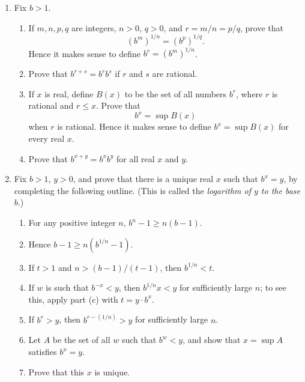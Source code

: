 \documentclass[12pt]{article}
\begin{document}
\begin{enumerate}
        \item Fix $b > 1$.
    \begin{enumerate}
        \item If $m, n, p, q$ are integers, $n > 0$, $q > 0$, and $r = m/n = p/q$, prove that
        \[
            (b^m)^{1/n} = (b^p)^{1/q}.
        \]
        Hence it makes sense to define $b^r = (b^m)^{1/n}$.

        \item Prove that $b^{r+s} = b^r b^s$ if $r$ and $s$ are rational.

        \item If $x$ is real, define $B(x)$ to be the set of all numbers $b^r$, where $r$ is rational and $r \leq x$. Prove that
        \[
            b^x = \sup B(x)
        \]
        when $r$ is rational. Hence it makes sense to define $b^x = \sup B(x)$ for every real $x$.

        \item Prove that $b^{x+y} = b^x b^y$ for all real $x$ and $y$.
    \end{enumerate}

    \item Fix $b > 1$, $y > 0$, and prove that there is a unique real $x$ such that $b^x = y$, by completing the following outline. (This is called the \emph{logarithm of $y$ to the base $b$}.)
    \begin{enumerate}
        \item For any positive integer $n$, $b^n - 1 \geq n(b - 1)$.

        \item Hence $b - 1 \geq n(b^{1/n} - 1)$.

        \item If $t > 1$ and $n > (b - 1)/(t - 1)$, then $b^{1/n} < t$.

        \item If $w$ is such that $b^{-x} < y$, then $b^{1/n} x < y$ for sufficiently large $n$; to see this, apply part (c) with $t = y \cdot b^x$.

        \item If $b^r > y$, then $b^{r - (1/n)} > y$ for sufficiently large $n$.

        \item Let $A$ be the set of all $w$ such that $b^w < y$, and show that $x = \sup A$ satisfies $b^x = y$.

        \item Prove that this $x$ is unique.
    \end{enumerate}


\end{enumerate}
\end{document}
